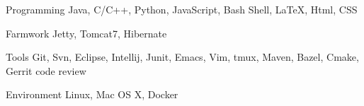 

\begin{cvskills}

  \cvskill
    {Programming} %
    {Java, C/C++, Python, JavaScript, Bash Shell, LaTeX, Html, CSS} %

  \cvskill
    {Farmwork} %
    {Jetty, Tomcat7, Hibernate} %

  \cvskill
    {Tools} %
    {Git, Svn, Eclipse, Intellij, Junit, Emacs, Vim, tmux, Maven, Bazel, Cmake, Gerrit code review} %

  \cvskill
    {Environment} %
    {Linux, Mac OS X, Docker} %

\end{cvskills}
